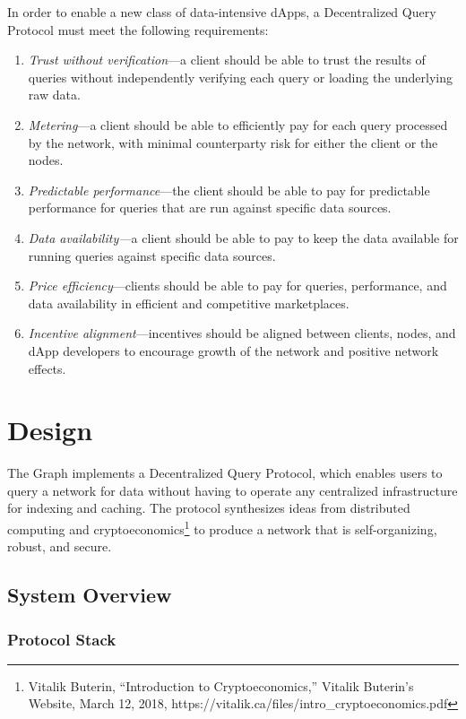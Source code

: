 \documentclass[12pt]{article}
\begin{document}
In order to enable a new class of data-intensive dApps, a Decentralized Query
Protocol must meet the following requirements:

\begin{enumerate}
\item \textit{Trust without verification}---a client should be able to trust the
  results of queries without independently verifying each query or loading the
  underlying raw data.
\item \textit{Metering}---a client should be able to efficiently pay for each
  query processed by the network, with minimal counterparty risk for either the
  client or the nodes.
\item \textit{Predictable performance}---the client should be able to pay for
  predictable performance for queries that are run against specific data
  sources.
\item \textit{Data availability---}a client should be able to pay to keep the
  data available for running queries against specific data sources.
\item \textit{Price efficiency}---clients should be able to pay for queries,
  performance, and data availability in efficient and competitive marketplaces.
\item \textit{Incentive alignment}---incentives should be aligned between
  clients, nodes, and dApp developers to encourage growth of the network and
  positive network effects.
\end{enumerate}

\section{Design}

The Graph implements a Decentralized Query Protocol, which enables users to
query a network for data without having to operate any centralized
infrastructure for indexing and caching. The protocol synthesizes ideas from
distributed computing and cryptoeconomics\footnote{Vitalik Buterin,
  ``Introduction to Cryptoeconomics,'' Vitalik Buterin's Website, March 12,
  2018, https://vitalik.ca/files/intro\_cryptoeconomics.pdf} to produce a
network that is self-organizing, robust, and secure.

\subsection{System Overview}

\subsubsection*{Protocol Stack}
\end{document}

